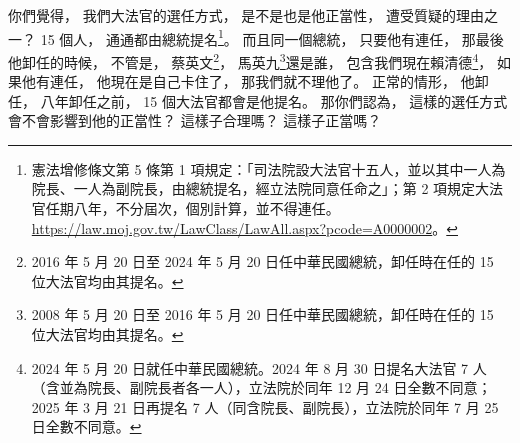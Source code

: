 \hypertarget{w01:cue:879}{}你們覺得，
\hypertarget{w01:cue:880}{}我們大法官的選任方式，
\hypertarget{w01:cue:881}{}是不是也是他正當性，
\hypertarget{w01:cue:882}{}遭受質疑的理由之一？
\hypertarget{w01:cue:883}{}15 個人，
\hypertarget{w01:cue:884}{}通通都由總統提名\footnote{憲法增修條文第 5 條第 1 項規定：「司法院設大法官十五人，並以其中一人為院長、一人為副院長，由總統提名，經立法院同意任命之」；第 2 項規定大法官任期八年，不分屆次，個別計算，並不得連任。\url{https://law.moj.gov.tw/LawClass/LawAll.aspx?pcode=A0000002}。}。
\hypertarget{w01:cue:885}{}而且同一個總統，
\hypertarget{w01:cue:886}{}只要他有連任，
\hypertarget{w01:cue:887}{}那最後他卸任的時候，
\hypertarget{w01:cue:888}{}不管是，
\hypertarget{w01:cue:889}{}蔡英文\footnote{2016 年 5 月 20 日至 2024 年 5 月 20 日任中華民國總統，卸任時在任的 15 位大法官均由其提名。}，
\hypertarget{w01:cue:890}{}馬英九\footnote{2008 年 5 月 20 日至 2016 年 5 月 20 日任中華民國總統，卸任時在任的 15 位大法官均由其提名。}還是誰，
\hypertarget{w01:cue:891}{}包含我們現在賴清德\footnote{2024 年 5 月 20 日就任中華民國總統。2024 年 8 月 30 日提名大法官 7 人（含並為院長、副院長者各一人），立法院於同年 12 月 24 日全數不同意；2025 年 3 月 21 日再提名 7 人（同含院長、副院長），立法院於同年 7 月 25 日全數不同意。}，
\hypertarget{w01:cue:892}{}如果他有連任，
\hypertarget{w01:cue:893}{}他現在是自己卡住了，
\hypertarget{w01:cue:894}{}那我們就不理他了。
\hypertarget{w01:cue:895}{}正常的情形，
\hypertarget{w01:cue:896}{}他卸任，
\hypertarget{w01:cue:897}{}八年卸任之前，
\hypertarget{w01:cue:898}{}15 個大法官都會是他提名。
\hypertarget{w01:cue:899}{}那你們認為，
\hypertarget{w01:cue:900}{}這樣的選任方式會不會影響到他的正當性？
\hypertarget{w01:cue:901}{}這樣子合理嗎？
\hypertarget{w01:cue:902}{}這樣子正當嗎？

